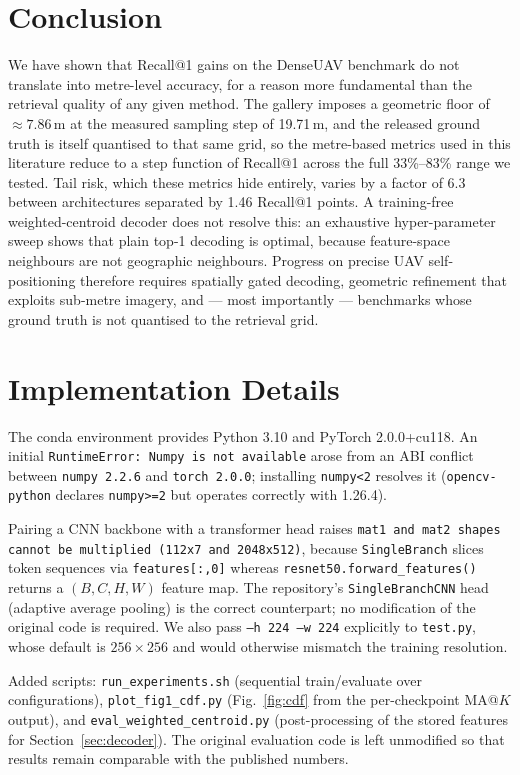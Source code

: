 \documentclass[journal]{IEEEtran}
\begin{document}
\section{Conclusion}
We have shown that Recall@1 gains on the DenseUAV benchmark do not translate into
metre-level accuracy, for a reason more fundamental than the retrieval quality of any
given method. The gallery imposes a geometric floor of $\approx 7.86$\,m at the measured
sampling step of 19.71\,m, and the released ground truth is itself quantised to that same
grid, so the metre-based metrics used in this literature reduce to a step function of
Recall@1 across the full 33\%--83\% range we tested. Tail risk, which these metrics hide
entirely, varies by a factor of 6.3 between architectures separated by 1.46 Recall@1
points. A training-free weighted-centroid decoder does not resolve this: an exhaustive
hyper-parameter sweep shows that plain top-1 decoding is optimal, because feature-space
neighbours are not geographic neighbours. Progress on precise UAV self-positioning
therefore requires spatially gated decoding, geometric refinement that exploits sub-metre
imagery, and --- most importantly --- benchmarks whose ground truth is not quantised to the
retrieval grid.

\appendices
\section{Implementation Details}
The conda environment provides Python 3.10 and PyTorch 2.0.0+cu118. An initial
\texttt{RuntimeError: Numpy is not available} arose from an ABI conflict between
\texttt{numpy 2.2.6} and \texttt{torch 2.0.0}; installing \texttt{numpy<2} resolves it
(\texttt{opencv-python} declares \texttt{numpy>=2} but operates correctly with 1.26.4).

Pairing a CNN backbone with a transformer head raises
\texttt{mat1 and mat2 shapes cannot be multiplied (112x7 and 2048x512)}, because
\texttt{SingleBranch} slices token sequences via \texttt{features[:,0]} whereas
\texttt{resnet50.forward\_features()} returns a $(B,C,H,W)$ feature map. The repository's
\texttt{SingleBranchCNN} head (adaptive average pooling) is the correct counterpart; no
modification of the original code is required. We also pass \texttt{--h 224 --w 224}
explicitly to \texttt{test.py}, whose default is $256 \times 256$ and would otherwise
mismatch the training resolution.

Added scripts: \texttt{run\_experiments.sh} (sequential train/evaluate over
configurations), \texttt{plot\_fig1\_cdf.py} (Fig.~\ref{fig:cdf} from the per-checkpoint
MA@$K$ output), and \texttt{eval\_weighted\_centroid.py} (post-processing of the stored
features for Section~\ref{sec:decoder}). The original evaluation code is left unmodified
so that results remain comparable with the published numbers.
\end{document}
